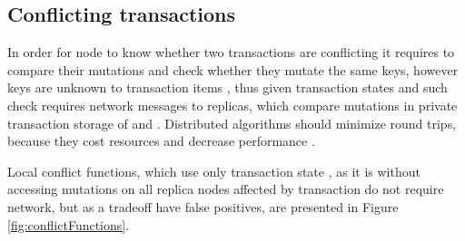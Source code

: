 
\subsection{Conflicting transactions}\label{sec:impl:conflictFunctions}
In order for node  to know whether two transactions are conflicting it requires to compare their mutations and check whether they mutate the same keys, however keys are unknown to transaction items \txItems, thus
given transaction states \txStateOne and \txStateTwo such check requires network messages to replicas, which compare mutations in private transaction storage of \txStateOne and \txStateTwo. 
Distributed algorithms should minimize round trips, because they cost resources and decrease performance \cite{rotem2006fallacies}.

Local conflict functions, which use only transaction state \txState, as it is without accessing mutations \mutations on all replica nodes affected by transaction \nodesTx do not require network, but as a tradeoff have false positives, are presented in Figure \ref{fig:conflictFunctions}. 



